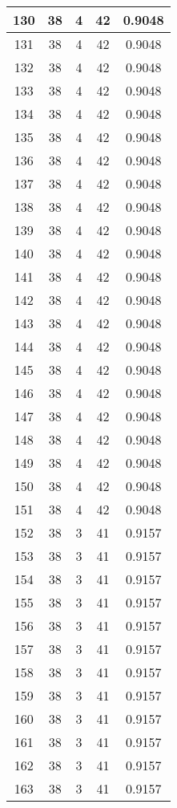 \documentclass[letterpaper, 12pt]{article}
\begin{document}
\begin{longtable}{|c|c|c|c|c|}
\hline
130 & 38 & 4 & 42 & 0.9048 \\
\hline
131 & 38 & 4 & 42 & 0.9048 \\
\hline
132 & 38 & 4 & 42 & 0.9048 \\
\hline
133 & 38 & 4 & 42 & 0.9048 \\
\hline
134 & 38 & 4 & 42 & 0.9048 \\
\hline
135 & 38 & 4 & 42 & 0.9048 \\
\hline
136 & 38 & 4 & 42 & 0.9048 \\
\hline
137 & 38 & 4 & 42 & 0.9048 \\
\hline
138 & 38 & 4 & 42 & 0.9048 \\
\hline
139 & 38 & 4 & 42 & 0.9048 \\
\hline
140 & 38 & 4 & 42 & 0.9048 \\
\hline
141 & 38 & 4 & 42 & 0.9048 \\
\hline
142 & 38 & 4 & 42 & 0.9048 \\
\hline
143 & 38 & 4 & 42 & 0.9048 \\
\hline
144 & 38 & 4 & 42 & 0.9048 \\
\hline
145 & 38 & 4 & 42 & 0.9048 \\
\hline
146 & 38 & 4 & 42 & 0.9048 \\
\hline
147 & 38 & 4 & 42 & 0.9048 \\
\hline
148 & 38 & 4 & 42 & 0.9048 \\
\hline
149 & 38 & 4 & 42 & 0.9048 \\
\hline
150 & 38 & 4 & 42 & 0.9048 \\
\hline
151 & 38 & 4 & 42 & 0.9048 \\
\hline
152 & 38 & 3 & 41 & 0.9157 \\
\hline
153 & 38 & 3 & 41 & 0.9157 \\
\hline
154 & 38 & 3 & 41 & 0.9157 \\
\hline
155 & 38 & 3 & 41 & 0.9157 \\
\hline
156 & 38 & 3 & 41 & 0.9157 \\
\hline
157 & 38 & 3 & 41 & 0.9157 \\
\hline
158 & 38 & 3 & 41 & 0.9157 \\
\hline
159 & 38 & 3 & 41 & 0.9157 \\
\hline
160 & 38 & 3 & 41 & 0.9157 \\
\hline
161 & 38 & 3 & 41 & 0.9157 \\
\hline
162 & 38 & 3 & 41 & 0.9157 \\
\hline
163 & 38 & 3 & 41 & 0.9157 \\

\end{longtable}
\end{document}
